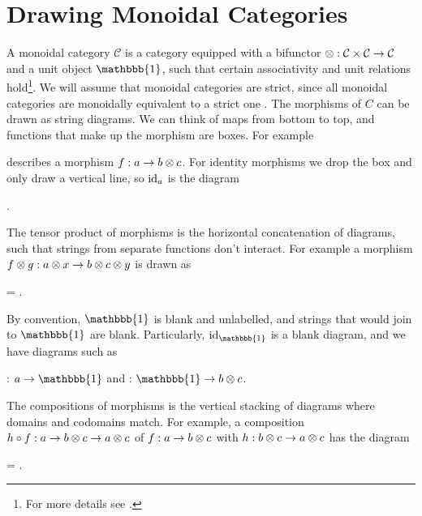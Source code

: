 \section{Drawing Monoidal Categories}

A monoidal category $\mathcal{C}$ is a category equipped with a bifunctor $\otimes: \mathcal{C} \times \mathcal{C} \to \mathcal{C}$ and a unit object $\mathbbb{1}$, such that certain associativity and unit relations hold\footnote{For more details see \cite{tensor-categories}.}. We will assume that monoidal categories are strict, since all monoidal categories are monoidally equivalent to a strict one \red{[Reference?]}. The morphisms of $C$ can be drawn as string diagrams. We can think of maps from bottom to top, and functions that make up the morphism are boxes. For example
\begin{center}
\end{center}
describes a morphism $f: a \to b \otimes c$. For identity morphisms we drop the box and only draw a vertical line, so $\operatorname{id}_a$ is the diagram
\begin{center}
    .
\end{center}
The tensor product of morphisms is the horizontal concatenation of diagrams, such that strings from separate functions don't interact. For example a morphism $f \otimes g: a \otimes x \to b \otimes c \otimes y$ is drawn as
\begin{center}
    = 
    .
\end{center}
By convention, $\mathbbb{1}$ is blank and unlabelled, and strings that would join to $\mathbbb{1}$ are blank. Particularly, $\id_\mathbbb{1}$ is a blank diagram, and we have diagrams such as
\begin{center}
    : $a \to \mathbbb{1}$
    \quad and \quad
    : $\mathbbb{1} \to b \tensor c$.
\end{center}
The compositions of morphisms is the vertical stacking of diagrams where domains and codomains match. For example, a composition $h \circ f: a \to b \otimes c \to a \otimes c$ of $f: a \to b \otimes c$ with $h: b \otimes c \to a \otimes c$ has the diagram
\begin{center}
    =
    .
\end{center}

